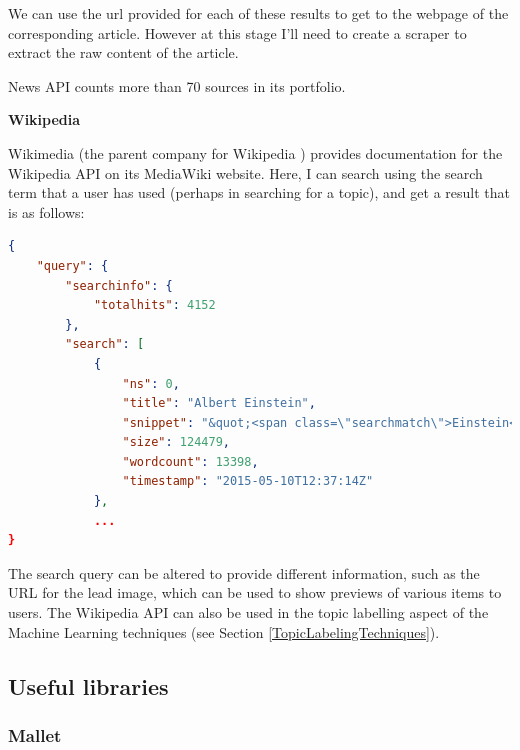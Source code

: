 \documentclass[12pt]{article}
\begin{document}
We can use the url provided for each of these results to get to the webpage of the corresponding article. However at this stage I'll need to create a scraper to extract the raw content of the article. 

News API counts more than 70 sources in its portfolio.

\textbf{Wikipedia}

Wikimedia (the parent company for Wikipedia \cite{wikipedia}) provides documentation for the Wikipedia API on its MediaWiki \cite{mediawiki} website. Here, I can search using the search term that a user has used (perhaps in searching for a topic), and get a result that is as follows:

\begin{lstlisting}[language=json, firstnumber=1, caption={A sample response to an API call to Wikipedia's API},captionpos=b]
{
    "query": {
        "searchinfo": {
            "totalhits": 4152
        },
        "search": [
            {
                "ns": 0,
                "title": "Albert Einstein",
                "snippet": "&quot;<span class=\"searchmatch\">Einstein</span>&quot; redirects here. For other uses, see <span class=\"searchmatch\">Albert</span> <span class=\"searchmatch\">Einstein</span> (disambiguation) and <span class=\"searchmatch\">Einstein</span> (disambiguation). <span class=\"searchmatch\">Albert</span> <span class=\"searchmatch\">Einstein</span> (/?alb?rt ?a?n?ta?n/; German:",
                "size": 124479,
                "wordcount": 13398,
                "timestamp": "2015-05-10T12:37:14Z"
            },
            ...
}
\end{lstlisting}

The search query can be altered to provide different information, such as the URL for the lead image, which can be used to show previews of various items to users. The Wikipedia API can also be used in the topic labelling aspect of the Machine Learning techniques (see Section \ref{TopicLabelingTechniques}).

\subsection{Useful libraries}

\label{libraries}

\subsubsection{Mallet}
\end{document}
